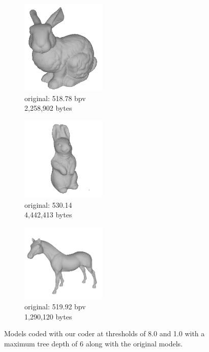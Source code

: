 \begin{figure}[t!]
        \begin{subfigure}[b]{1.9in}
                \includegraphics[width=1.6in]{images/results/compression/bunnyorig}
                \caption{original: 518.78 bpv\\2,258,902 bytes}
                \label{fig:FIG_BUNNYO}
        \end{subfigure}%
        \begin{subfigure}[b]{1.9in}
                \includegraphics[width=1.6in]{images/results/compression/rabbitorig}
                \caption{original: 530.14\\4,442,413 bytes}
                \label{fig:FIG_RABBITO}
        \end{subfigure}%
        \begin{subfigure}[b]{1.9in}
                \includegraphics[width=1.6in]{images/results/compression/horseorig}
                \caption{original: 519.92 bpv\\1,290,120 bytes}
                \label{fig:FIG_HORSEO}
        \end{subfigure}
       
       \caption{Models coded with our coder at thresholds of 8.0 and 1.0 with a maximum tree depth of 6 along with the original models.}
       \label{fig:FIGS}
\end{figure}

